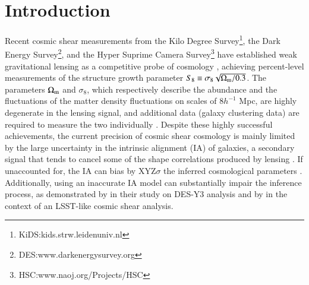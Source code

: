 \section{Introduction}
\label{sec:intro}

Recent cosmic shear measurements from the Kilo Degree Survey\footnote{KiDS:kids.strw.leidenuniv.nl}, the Dark Energy Survey\footnote{DES:www.darkenergysurvey.org}, and the Hyper Suprime Camera Survey\footnote{HSC:www.naoj.org/Projects/HSC} have established weak gravitational lensing as a competitive probe of cosmology \citep[see. \eg][]{KiDS1000_Asgari, KiDS1000_vdB, KiDS1000_Li, DESY3_Secco, DESY3_Amon, HSCY3_Cl, HSCY3_2pcf}, achieving  percent-level measurements of the structure growth parameter $S_8\equiv\sigma_8\sqrt{\Omega_{\rm m}/0.3}$.
The parameters $\Omega_{\rm m}$ and $\sigma_8$, which respectively describe the abundance and the fluctuations of the matter density fluctuations on scales of $8h^{-1}$ Mpc, are highly degenerate in the lensing signal, and additional data (\eg galaxy clustering data) are required to measure the two individually \citep{Heymans, DES3x2pt, HSC3x2} .
Despite these highly successful achievements, the current precision of cosmic shear cosmology is mainly limited by the large uncertainty in the intrinsic alignment (IA) of galaxies, a secondary signal that tends to cancel some of the shape correlations produced by lensing \citep[see. \eg][for reviews on IA]{Troxel_IA_review_2015, Kirk_IA_review_2015, Joachimi_IA_review_2015, Kiessling_IA_review_2015}. 
If unaccounted for, the IA can bias by XYZ$\sigma$ the inferred cosmological parameters \citep{BlazekKrause}.
Additionally, using an inaccurate IA model can substantially impair the inference process, as demonstrated by \citet{DESY3_Secco} in their study on DES-Y3 analysis and by \citep{Paopiamsap2024} in the context of an LSST-like cosmic shear analysis.

